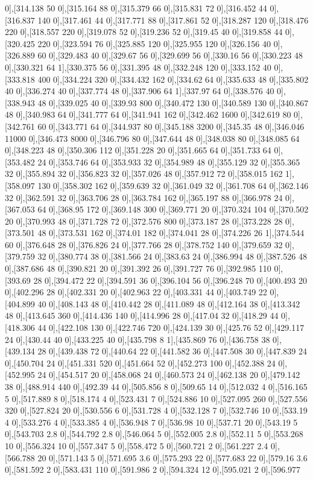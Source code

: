 {0],[314.138 50 0],[315.164 88 0],[315.379 66 0],[315.831 72 0],[316.452 44 0],[316.837 140 0],[317.461 44 0],[317.771 88 0],[317.861 52 0],[318.287 120 0],[318.476 220 0],[318.557 220 0],[319.078 52 0],[319.236 52 0],[319.45 40 0],[319.858 44 0],[320.425 220 0],[323.594 76 0],[325.885 120 0],[325.955 120 0],[326.156 40 0],[326.889 60 0],[329.483 40 0],[329.67 56 0],[329.699 56 0],[330.16 56 0],[330.223 48 0],[330.321 64 1],[330.375 56 0],[331.395 48 0],[332.248 120 0],[333.152 40 0],[333.818 400 0],[334.224 320 0],[334.432 162 0],[334.62 64 0],[335.633 48 0],[335.802 40 0],[336.274 40 0],[337.774 48 0],[337.906 64 1],[337.97 64 0],[338.576 40 0],[338.943 48 0],[339.025 40 0],[339.93 800 0],[340.472 130 0],[340.589 130 0],[340.867 48 0],[340.983 64 0],[341.777 64 0],[341.941 162 0],[342.462 1600 0],[342.619 80 0],[342.761 60 0],[343.771 64 0],[344.937 80 0],[345.188 3200 0],[345.35 48 0],[346.046 11000 0],[346.473 8000 0],[346.796 80 0],[347.644 48 0],[348.038 80 0],[348.085 64 0],[348.223 48 0],[350.306 112 0],[351.228 20 0],[351.665 64 0],[351.733 64 0],[353.482 24 0],[353.746 64 0],[353.933 32 0],[354.989 48 0],[355.129 32 0],[355.365 32 0],[355.894 32 0],[356.823 32 0],[357.026 48 0],[357.912 72 0],[358.015 162 1],[358.097 130 0],[358.302 162 0],[359.639 32 0],[361.049 32 0],[361.708 64 0],[362.146 32 0],[362.591 32 0],[363.706 28 0],[363.784 162 0],[365.197 88 0],[366.978 24 0],[367.053 64 0],[368.95 172 0],[369.148 300 0],[369.771 20 0],[370.324 104 0],[370.502 20 0],[370.993 48 0],[371.728 72 0],[372.576 800 0],[373.187 28 0],[373.228 28 0],[373.501 48 0],[373.531 162 0],[374.01 182 0],[374.041 28 0],[374.226 26 1],[374.544 60 0],[376.648 28 0],[376.826 24 0],[377.766 28 0],[378.752 140 0],[379.659 32 0],[379.759 32 0],[380.774 38 0],[381.566 24 0],[383.63 24 0],[386.994 48 0],[387.526 48 0],[387.686 48 0],[390.821 20 0],[391.392 26 0],[391.727 76 0],[392.985 110 0],[393.69 28 0],[394.472 22 0],[394.591 36 0],[396.104 56 0],[396.248 70 0],[400.493 20 0],[402.296 28 0],[402.331 20 0],[402.963 22 0],[403.331 44 0],[403.749 22 0],[404.899 40 0],[408.143 48 0],[410.442 28 0],[411.089 48 0],[412.164 38 0],[413.342 48 0],[413.645 360 0],[414.436 140 0],[414.996 28 0],[417.04 32 0],[418.29 44 0],[418.306 44 0],[422.108 130 0],[422.746 720 0],[424.139 30 0],[425.76 52 0],[429.117 24 0],[430.44 40 0],[433.225 40 0],[435.798 8 1],[435.869 76 0],[436.758 38 0],[439.134 28 0],[439.438 72 0],[440.64 22 0],[441.582 36 0],[447.508 30 0],[447.839 24 0],[450.704 24 0],[451.331 520 0],[451.664 52 0],[452.273 100 0],[452.388 24 0],[452.995 24 0],[454.517 20 0],[458.068 24 0],[460.573 24 0],[462.138 20 0],[479.142 38 0],[488.914 440 0],[492.39 44 0],[505.856 8 0],[509.65 14 0],[512.032 4 0],[516.165 5 0],[517.889 8 0],[518.174 4 0],[523.431 7 0],[524.886 10 0],[527.095 260 0],[527.556 320 0],[527.824 20 0],[530.556 6 0],[531.728 4 0],[532.128 7 0],[532.746 10 0],[533.19 4 0],[533.276 4 0],[533.385 4 0],[536.948 7 0],[536.98 10 0],[537.71 20 0],[543.19 5 0],[543.703 2.8 0],[544.792 2.8 0],[546.064 5 0],[552.005 2.8 0],[552.11 5 0],[553.268 10 0],[556.324 10 0],[557.347 5 0],[558.472 5 0],[560.721 2 0],[561.227 2.4 0],[566.788 20 0],[571.143 5 0],[571.695 3.6 0],[575.293 22 0],[577.683 22 0],[579.16 3.6 0],[581.592 2 0],[583.431 110 0],[591.986 2 0],[594.324 12 0],[595.021 2 0],[596.977 }

